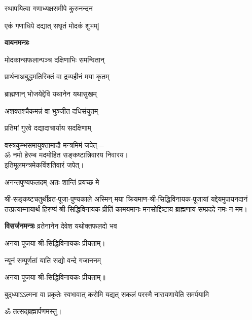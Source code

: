 \begin{center}
\twolineshloka*
{[अथैकविंशतिं गृह्य मोदकान् घृतपाचितान्}
{स्थापयित्वा गणाध्यक्षसमीपे कुरुनन्दन}

{एकं गणाधिपे दद्यात् सघृतं मोदकं शुभम्]}

\centerline{\textbf{वायनमन्त्रः}}

{मोदकान्सफलान्पञ्च दक्षिणाभिः समन्वितान्}

{प्रार्थनाअबुद्धमतिरिक्तं वा द्रव्यहीनं मया कृतम्}

{ब्राह्मणान् भोजयेद्देवि यथानेन यथासुखम्}

{अशक्तश्चैकमन्नं वा भुञ्जीत दधिसंयुतम्}

{प्रतिमां गुरवे दद्यादाचार्याय सदक्षिणाम्}

वस्त्रकुम्भसमायुक्तामादौ मन्त्रमिमं जपेत्—\\
ॐ नमो हेरम्ब मदमोहित सङ्कष्टान्निवारय निवारय।\\
इतिमूलमन्त्रमेकविंशतिवारं जपेत्।
\medskip


{अनन्तपुण्यफलदम् अतः शान्तिं प्रयच्छ मे}

श्री-सङ्कष्टचतुर्थीव्रत-पूजा-पुण्यकाले अस्मिन् मया क्रियमाण-श्री-सिद्धिविनायक-पूजायां
यद्देयमुपायनदानं तत्प्रत्याम्नायार्थं हिरण्यं श्री-सिद्धिविनायक-प्रीतिं
कामयमानः मनसोद्दिष्टाय ब्राह्मणाय सम्प्रददे नमः न मम।

\textbf{विसर्जनमन्त्रः}
{व्रतेनानेन देवेश यथोक्तफलदो भव}

अनया पूजया श्री-सिद्धिविनायकः प्रीयताम्। 


{न्यूनं सम्पूर्णतां याति सद्यो वन्दे गजाननम्} 

अनया पूजया श्री-सिद्धिविनायकः प्रीयताम्॥ 

{बुद्‌ध्याऽऽत्मना वा प्रकृतेः स्वभावात्}
{करोमि यद्यत् सकलं परस्मै}
{नारायणायेति समर्पयामि}

ॐ तत्सद्ब्रह्मार्पणमस्तु।

\end{center}


